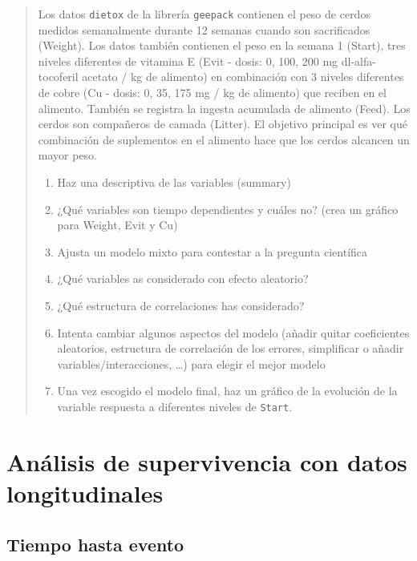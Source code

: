 \documentclass[
]{book}
\providecommand{\tightlist}{%
  \setlength{\itemsep}{0pt}\setlength{\parskip}{0pt}}
\begin{document}
\begin{quote}
Los datos \texttt{dietox} de la librería \texttt{geepack} contienen el peso de cerdos medidos semanalmente durante 12 semanas cuando son sacrificados (Weight). Los datos también contienen el peso en la semana 1 (Start), tres niveles diferentes de vitamina E (Evit - dosis: 0, 100, 200 mg dl-alfa-tocoferil acetato / kg de alimento) en combinación con 3 niveles diferentes de cobre (Cu - dosis: 0, 35, 175 mg / kg de alimento) que reciben en el alimento. También se registra la ingesta acumulada de alimento (Feed). Los cerdos son compañeros de camada (Litter). El objetivo principal es ver qué combinación de suplementos en el alimento hace que los cerdos alcancen un mayor peso.

\begin{enumerate}
\def\labelenumi{\arabic{enumi}.}
\tightlist
\item
  Haz una descriptiva de las variables (summary)
\item
  ¿Qué variables son tiempo dependientes y cuáles no? (crea un gráfico para Weight, Evit y Cu)
\item
  Ajusta un modelo mixto para contestar a la pregunta científica
\item
  ¿Qué variables as considerado con efecto aleatorio?
\item
  ¿Qué estructura de correlaciones has considerado?
\item
  Intenta cambiar algunos aspectos del modelo (añadir quitar coeficientes aleatorios, estructura de correlación de los errores, simplificar o añadir variables/interacciones, \ldots) para elegir el mejor modelo
\item
  Una vez escogido el modelo final, haz un gráfico de la evolución de la variable respuesta a diferentes niveles de \texttt{Start}.
\end{enumerate}
\end{quote}

\hypertarget{anuxe1lisis-de-supervivencia-con-datos-longitudinales}{%
\chapter{Análisis de supervivencia con datos longitudinales}\label{anuxe1lisis-de-supervivencia-con-datos-longitudinales}}

\hypertarget{tiempo-hasta-evento}{%
\section{Tiempo hasta evento}\label{tiempo-hasta-evento}}
\end{document}

